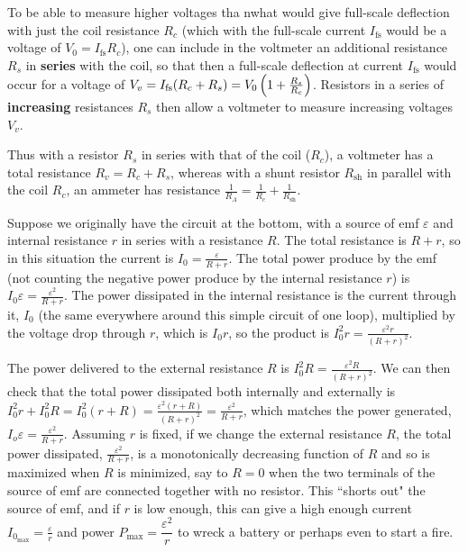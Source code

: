 To be able to measure higher voltages tha nwhat would give full-scale deflection with just the coil resistance $R_c$ (which with the full-scale current $I_\text{fs}$ would be a voltage of $V_0 = I_\text{fs}R_c$), one can include in the voltmeter an additional resistance $R_s$ in \textbf{series} with the coil, so that then a full-scale deflection at current $I_\text{fs}$ would occur for a voltage of $V_v = I_\text{fs}(R_c + R_s) = V_0\left(  1 + \frac{R_s}{R_c}  \right)$. Resistors in a series of \textbf{increasing} resistances $R_s$ then allow a voltmeter to measure increasing voltages $V_v$.

Thus with a resistor $R_s$ in series with that of the coil ($R_c$), a voltmeter has a total resistance $R_v = R_c + R_s$, whereas with a shunt resistor $R_\text{sh}$ in parallel with the coil $R_c$, an ammeter has resistance $\frac{1}{R_A} = \frac{1}{R_c} + \frac{1}{R_\text{sh}}$.

Suppose we originally have the circuit at the bottom, with a source of emf $\varepsilon$ and internal resistance $r$ in series with a resistance $R$. The total resistance is $R + r$, so in this situation the current is $I_0 = \frac{\varepsilon}{R + r}$. The total power produce by the emf (not counting the negative power produce by the internal resistance $r$) is $I_0\varepsilon = \frac{\varepsilon^2}{R+r}$. The power dissipated in the internal resistance is the current through it, $I_0$ (the same everywhere around this simple circuit of one loop), multiplied by the voltage drop through $r$, which is $I_0r$, so the product is $I_0^2r = \frac{\varepsilon^2r}{(R+r)^2}$.

The power delivered to the external resistance $R$ is $I_0^2R = \frac{\varepsilon^2R}{(R+r)^2}$. We can then check that the total power dissipated both internally and externally is $I_0^2r + I_0^2R = I_0^2(r+R) = \frac{\varepsilon^2(r+R)}{(R+r)^2} = \frac{\varepsilon^2}{R + r}$, which matches the power generated, $I_o\varepsilon = \frac{\varepsilon^2}{R+r}$. Assuming $r$ is fixed, if we change the external resistance $R$, the total power dissipated, $\frac{\varepsilon^2}{R+r}$, is a monotonically decreasing function of $R$ and so is maximized when $R$ is minimized, say to $R=0$ when the two terminals of the source of emf are connected together with no resistor. This ``shorts out" the source of emf, and if $r$ is low enough, this can give a high enough current $I_{0_\text{max}} = \frac{\varepsilon}{r}$ and power $P_\text{max} = \dfrac{\varepsilon^2}{r}$ to wreck a battery or perhaps even to start a fire.

